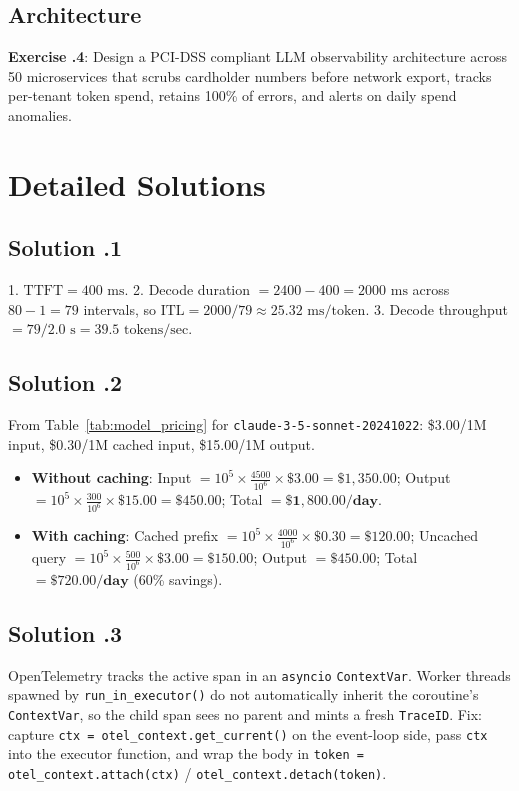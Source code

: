 \subsection*{Architecture}
\textbf{Exercise \thechapter.4}: Design a PCI-DSS compliant LLM observability architecture across 50 microservices that scrubs cardholder numbers before network export, tracks per-tenant token spend, retains 100\% of errors, and alerts on daily spend anomalies.

\section{Detailed Solutions}

\subsection*{Solution \thechapter.1}
1. $\text{TTFT} = 400\text{ ms}$. 2. Decode duration $= 2400 - 400 = 2000\text{ ms}$ across $80 - 1 = 79$ intervals, so $\text{ITL} = 2000 / 79 \approx 25.32\text{ ms/token}$. 3. Decode throughput $= 79 / 2.0\text{ s} = 39.5\text{ tokens/sec}$.

\subsection*{Solution \thechapter.2}
From Table~\ref{tab:model_pricing} for \texttt{claude-3-5-sonnet-20241022}: \$3.00/1M input, \$0.30/1M cached input, \$15.00/1M output.
\begin{itemize}
  \item \textbf{Without caching}: Input $= 10^5 \times \frac{4500}{10^6} \times \$3.00 = \$1{,}350.00$; Output $= 10^5 \times \frac{300}{10^6} \times \$15.00 = \$450.00$; Total $= \mathbf{\$1{,}800.00/\text{day}}$.
  \item \textbf{With caching}: Cached prefix $= 10^5 \times \frac{4000}{10^6} \times \$0.30 = \$120.00$; Uncached query $= 10^5 \times \frac{500}{10^6} \times \$3.00 = \$150.00$; Output $= \$450.00$; Total $= \mathbf{\$720.00/\text{day}}$ (60\% savings).
\end{itemize}

\subsection*{Solution \thechapter.3}
OpenTelemetry tracks the active span in an \texttt{asyncio} \texttt{ContextVar}. Worker threads spawned by \texttt{run\_in\_executor()} do not automatically inherit the coroutine's \texttt{ContextVar}, so the child span sees no parent and mints a fresh \texttt{TraceID}. Fix: capture \texttt{ctx = otel\_context.get\_current()} on the event-loop side, pass \texttt{ctx} into the executor function, and wrap the body in \texttt{token = otel\_context.attach(ctx)} / \texttt{otel\_context.detach(token)}.

